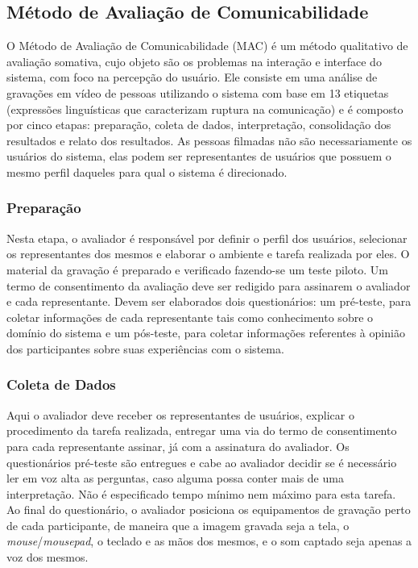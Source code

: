 \subsection{Método de Avaliação de Comunicabilidade} \label{MAC}

\indent O Método de Avaliação de Comunicabilidade (MAC) é um método qualitativo de avaliação somativa, cujo objeto são os problemas na interação e interface do sistema, com foco na percepção do usuário. Ele consiste em uma análise de gravações em vídeo de pessoas utilizando o sistema com base em 13 etiquetas (expressões linguísticas que caracterizam ruptura na comunicação) e é composto por cinco etapas\cite{IHCbook}: preparação, coleta de dados, interpretação, consolidação dos resultados e relato dos resultados. As pessoas filmadas não são necessariamente os usuários do sistema, elas podem ser representantes de usuários que possuem o mesmo perfil daqueles para qual o sistema é direcionado. 

\subsubsection{Preparação}

\indent Nesta etapa, o avaliador é responsável por definir o perfil dos usuários, selecionar os representantes dos mesmos e elaborar o ambiente e tarefa realizada por eles. O material da gravação é preparado e verificado fazendo-se um teste piloto. Um termo de consentimento da avaliação deve ser redigido para assinarem o avaliador e cada representante. Devem ser elaborados dois questionários: um pré-teste, para coletar informações de cada representante tais como conhecimento sobre o domínio do sistema e um pós-teste, para coletar informações referentes à opinião dos participantes sobre suas experiências com o sistema.

\subsubsection{Coleta de Dados}

\indent Aqui o avaliador deve receber os representantes de usuários, explicar o procedimento da tarefa realizada, entregar uma via do termo de consentimento para cada representante assinar, já com a assinatura do avaliador. Os questionários pré-teste são entregues e cabe ao avaliador decidir se é necessário ler em voz alta as perguntas, caso alguma possa conter mais de uma interpretação. Não é especificado tempo mínimo nem máximo para esta tarefa. Ao final do questionário, o avaliador posiciona os equipamentos de gravação perto de cada participante, de maneira que a imagem gravada seja a tela, o \textit{mouse}/\textit{mousepad}, o teclado e as mãos dos mesmos, e o som captado seja apenas a voz dos mesmos. 

